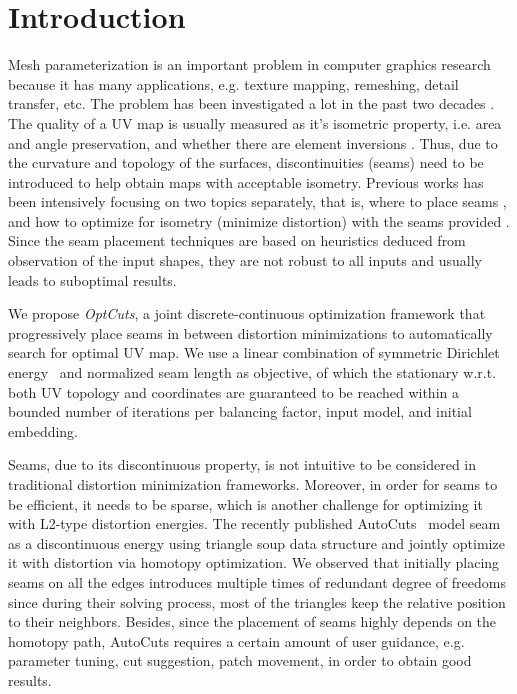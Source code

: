 \section{Introduction}

Mesh parameterization is an important problem in computer graphics research because it has many applications, e.g. texture mapping, remeshing, detail transfer, etc. The problem has been investigated a lot in the past two decades \cite{some mesh parameterization papers}. The quality of a UV map is usually measured as it's isometric property, i.e. area and angle preservation, and whether there are element inversions \cite{Sander2001Texture,Sheffer2005ABFPP}. Thus, due to the curvature and topology of the surfaces, discontinuities (seams) need to be introduced to help obtain maps with acceptable isometry.
Previous works has been intensively focusing on two topics separately, that is, where to place seams \cite{some seam placement papers}, and how to optimize for isometry (minimize distortion) with the seams provided \cite{some distortion minimization papers}. Since the seam placement techniques are based on heuristics deduced from observation of the input shapes, they are not robust to all inputs and usually leads to suboptimal results.

We propose {\em OptCuts}, a joint discrete-continuous optimization framework that progressively place seams in between distortion minimizations to automatically search for optimal UV map. We use a linear combination of symmetric Dirichlet energy~\cite{Smith2015Bijective} and normalized seam length as objective, of which the stationary w.r.t. both UV topology and coordinates are guaranteed to be reached within a bounded number of iterations per balancing factor, input model, and initial embedding.

Seams, due to its discontinuous property, is not intuitive to be considered in traditional distortion minimization frameworks. Moreover, in order for seams to be efficient, it needs to be sparse, which is another challenge for optimizing it with L2-type distortion energies. The recently published AutoCuts~\cite{Poranne2017Autocuts} model seam as a discontinuous energy using triangle soup data structure and jointly optimize it with distortion via homotopy optimization. We observed that initially placing seams on all the edges introduces multiple times of redundant degree of freedoms since during their solving process, most of the triangles keep the relative position to their neighbors. Besides, since the placement of seams highly depends on the homotopy path, AutoCuts requires a certain amount of user guidance, e.g. parameter tuning, cut suggestion, patch movement, in order to obtain good results.

